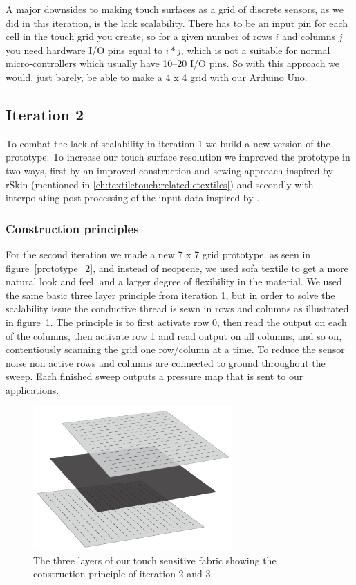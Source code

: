 A major downsides to making touch surfaces as a grid of discrete sensors, as we did in this iteration, is the lack scalability.
There has to be an input pin for each cell in the touch grid you create, so for a given number of rows \(i\) and columns \(j\) you need hardware I/O pins equal to \(i*j\), which is not a suitable for normal micro-controllers which usually have 10--20 I/O pins.
So with this approach we would, just barely, be able to make a 4 x 4 grid with our Arduino Uno. 

\subsection{Iteration 2}
\label{ch:textiletouch:it2}
To combat the lack of scalability in iteration 1 we build a new version of the prototype.
To increase our touch surface resolution we improved the prototype in two ways, first by an improved construction and sewing approach inspired by rSkin (mentioned in \ref{ch:textiletouch:related:etextiles}) and secondly with interpolating post-processing of the input data inspired by \citep{rosenberg2009unmousepad}. 

\subsubsection{Construction principles}
For the second iteration we made a new 7 x 7 grid prototype, as seen in figure~\ref{prototype_2}, and instead of neoprene, we used sofa textile to get a more natural look and feel, and a larger degree of flexibility in the material.
We used the same basic three layer principle from iteration 1, but in order to solve the scalability issue the conductive thread is sewn in rows and columns as illustrated in figure~\ref{layers_iteration2_and_3}.
The principle is to first activate row 0, then read the output on each of the columns, then activate row 1 and read output on all columns, and so on, contentiously scanning the grid one row/column at a time.
To reduce the sensor noise non active rows and columns are connected to ground throughout the sweep.
Each finished sweep outputs a pressure map that is sent to our applications.

\begin{figure}[h]
	\centering
  		\includegraphics[width=3in]{figures/touch/layers_it_23}
	\caption[The three layers of our touch sensitive fabric, iteration 2 and 3.]
   {The three layers of our touch sensitive fabric showing the construction principle of iteration 2 and 3.}
   \label{layers_iteration2_and_3}
\end{figure}

